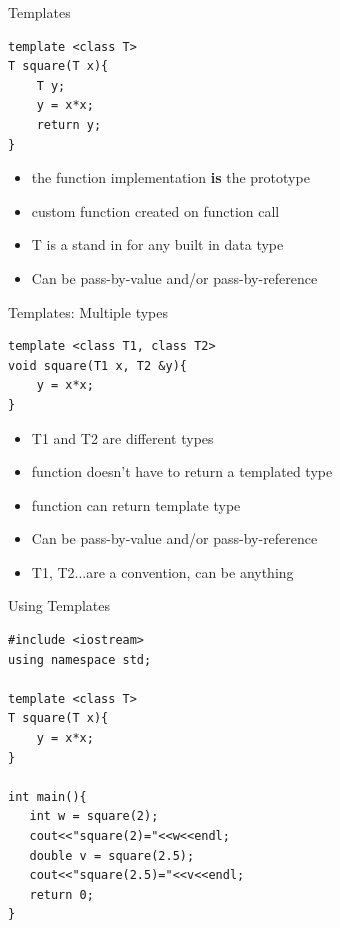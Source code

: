 \documentclass[xcolor={dvipsnames}]{beamer}
\begin{document}
\begin{frame}[fragile]{Templates}
	\begin{center} 
	\begin{verbatim}
template <class T>
T square(T x){
    T y;
    y = x*x;
    return y;
}   
	\end{verbatim}
	\end{center}
	\begin{center}
		\begin{itemize}
			\item the function implementation \textbf{is} the prototype
			\item custom function created on function call
			\item T is a stand in for any built in data type
			\item Can be pass-by-value and/or pass-by-reference	
		\end{itemize}
	\end{center}
\end{frame}

\begin{frame}[fragile]{Templates: Multiple types}
	\begin{center} 
	\begin{verbatim}
template <class T1, class T2>
void square(T1 x, T2 &y){
    y = x*x;
}   
	\end{verbatim}
	\end{center}
	\begin{center}
		\begin{itemize}
			\item T1 and T2 are different types
			\item function doesn't have to return a templated type
			\item function can return template type
			\item Can be pass-by-value and/or pass-by-reference
			\item T1, T2...are a convention, can be anything
		\end{itemize}
	\end{center}
\end{frame}

\begin{frame}[fragile]{Using Templates}
\begin{verbatim}
#include <iostream>
using namespace std;

template <class T>
T square(T x){
    y = x*x;
}

int main(){
   int w = square(2);
   cout<<"square(2)="<<w<<endl;
   double v = square(2.5);
   cout<<"square(2.5)="<<v<<endl;
   return 0;
}
\end{verbatim}
\end{frame}
\end{document}
